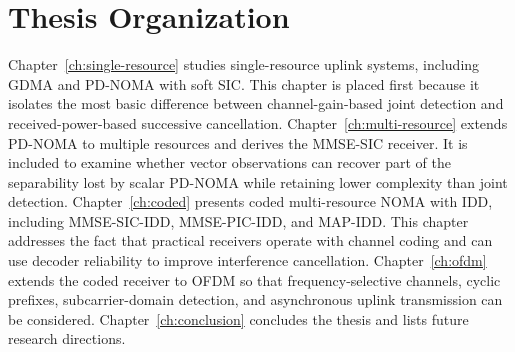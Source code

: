 \section{Thesis Organization}

Chapter~\ref{ch:single-resource} studies single-resource uplink systems, including GDMA and PD-NOMA with soft SIC. This chapter is placed first because it isolates the most basic difference between channel-gain-based joint detection and received-power-based successive cancellation. Chapter~\ref{ch:multi-resource} extends PD-NOMA to multiple resources and derives the MMSE-SIC receiver. It is included to examine whether vector observations can recover part of the separability lost by scalar PD-NOMA while retaining lower complexity than joint detection. Chapter~\ref{ch:coded} presents coded multi-resource NOMA with IDD, including MMSE-SIC-IDD, MMSE-PIC-IDD, and MAP-IDD. This chapter addresses the fact that practical receivers operate with channel coding and can use decoder reliability to improve interference cancellation. Chapter~\ref{ch:ofdm} extends the coded receiver to OFDM so that frequency-selective channels, cyclic prefixes, subcarrier-domain detection, and asynchronous uplink transmission can be considered. Chapter~\ref{ch:conclusion} concludes the thesis and lists future research directions.
